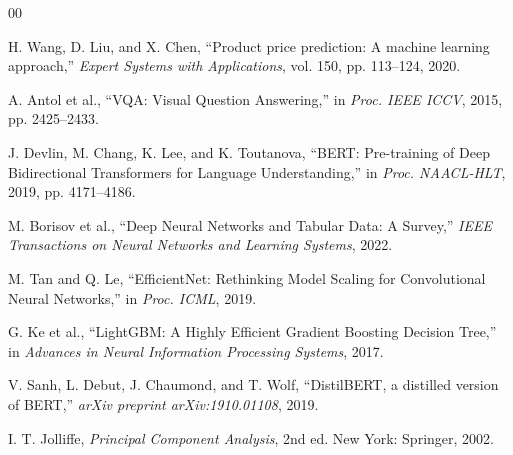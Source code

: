 \documentclass[conference]{IEEEtran}
\begin{document}
\begin{thebibliography}{00}

 H. Wang, D. Liu, and X. Chen, ``Product price prediction: A machine learning approach,'' \textit{Expert Systems with Applications}, vol. 150, pp. 113--124, 2020.

 A. Antol et al., ``VQA: Visual Question Answering,'' in \textit{Proc. IEEE ICCV}, 2015, pp. 2425--2433.

 J. Devlin, M. Chang, K. Lee, and K. Toutanova, ``BERT: Pre-training of Deep Bidirectional Transformers for Language Understanding,'' in \textit{Proc. NAACL-HLT}, 2019, pp. 4171--4186.

 M. Borisov et al., ``Deep Neural Networks and Tabular Data: A Survey,'' \textit{IEEE Transactions on Neural Networks and Learning Systems}, 2022.

 M. Tan and Q. Le, ``EfficientNet: Rethinking Model Scaling for Convolutional Neural Networks,'' in \textit{Proc. ICML}, 2019.

 G. Ke et al., ``LightGBM: A Highly Efficient Gradient Boosting Decision Tree,'' in \textit{Advances in Neural Information Processing Systems}, 2017.

 V. Sanh, L. Debut, J. Chaumond, and T. Wolf, ``DistilBERT, a distilled version of BERT,'' \textit{arXiv preprint arXiv:1910.01108}, 2019.

 I. T. Jolliffe, \textit{Principal Component Analysis}, 2nd ed. New York: Springer, 2002.

\end{thebibliography}
\end{document}
